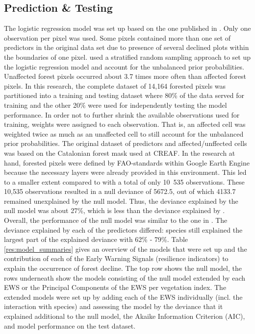 \newpage
\subsection{Prediction \& Testing}\label{res_pred_test}
The logistic regression model was set up based on the one published in \cite{chaparro2017}. Only one observation per pixel was used. Some pixels contained more than one set of predictors in the original data set due to presence of several declined plots within the boundaries of one pixel. \cite{chaparro2017} used a stratified random sampling approach to set up the logistic regression model and account for the unbalanced prior probabilities. Unaffected forest pixels occurred about 3.7 times more often than affected forest pixels. In this research, the complete dataset of 14,164 forested pixels was partitioned into a training and testing dataset where 80\% of the data served for training and the other 20\% were used for independently testing the model performance. In order not to further shrink the available observations used for training, weights were assigned to each observation. That is, an affected cell was weighted twice as much as an unaffected cell to still account for the unbalanced prior probabilities. The original dataset of predictors and affected/unffected cells was based on the Catalonian forest mask used at CREAF. In the research at hand, forested pixels were defined by FAO-standards within Google Earth Engine because the necessary layers were already provided in this environment. This led to a smaller extent compared to \cite{chaparro2017} with a total of only 10~535 observations. These 10,535 observations resulted in a null deviance of 5672.5, out of which 4133.7 remained unexplained by the null model. Thus, the deviance explained by the null model was about 27\%, which is less than the deviance explained by \cite{chaparro2017}.\\
Overall, the performance of the null model was similar to the one in \cite{chaparro2017}. The deviance explained by each of the predictors differed: species still explained the largest part of the explained deviance with 62\% - 79\%. Table \ref{res:model_summaries} gives an overview of the models that were set up and the contribution of each of the Early Warning Signals (resilience indicators) to explain the occurrence of forest decline. The top row shows the null model, the rows underneath show the models consisting of the null model extended by each EWS or the Principal Components of the EWS per vegetation index. The extended models were set up by adding each of the EWS individually (incl. the interaction with species) and assessing the model by the deviance that it explained additional to the null model, the Akaike Information Criterion (AIC), and model performance on the test dataset.\\

